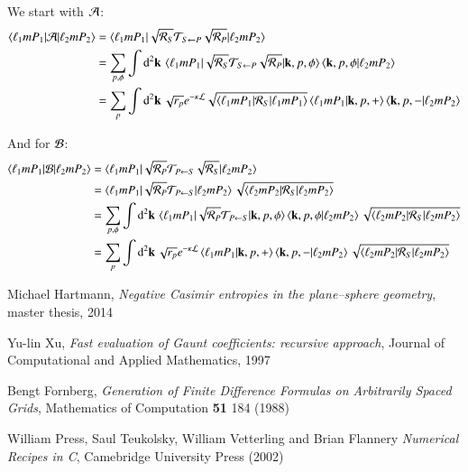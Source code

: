 \documentclass[superscriptaddress,prb]{revtex4-1}
\newcommand{\e}{e}    %
\renewcommand{\vec}[1]{{\mathbf{#1}}}
\begin{document}
We start with $\cal A$:
\begin{align}
\braket{\ell_1 m P_1 | {\cal A} | \ell_2 m P_2} &= \braket{\ell_1 m P_1 | \sqrt{{\cal R}_S} {\cal T}_{S\leftarrow P} \sqrt{{\cal R}_P} | \ell_2 m P_2} \\
&= \sum_{p,\phi} \int\mathrm{d}^2\vec k \, \braket{\ell_1 m P_1 | \sqrt{{\cal R}_S} {\cal T}_{S\leftarrow P} \sqrt{{\cal R}_P} | \vec k,p,\phi} \braket{\vec k, p, \phi | \ell_2 m P_2} \\
&= \sum_p \int\mathrm{d}^2\vec k \, \sqrt{r_p} \e^{-\kappa\cal L} \sqrt{\braket{\ell_1 m P_1 | {\cal R}_S | \ell_1 m P_1}} \braket{\ell_1 m P_1 | \vec k,p,+} \braket{\vec k, p,- | \ell_2 m P_2} \\
\end{align}

And for $\cal B$:
\begin{align}
\braket{\ell_1 m P_1 | {\cal B} | \ell_2 m P_2} &= \braket{\ell_1 m P_1 | \sqrt{{\cal R}_P} {\cal T}_{P\leftarrow S} \sqrt{{\cal R}_S} | \ell_2 m P_2} \\
&= \braket{\ell_1 m P_1 | \sqrt{{\cal R}_P} {\cal T}_{P\leftarrow S} | \ell_2 m P_2} \sqrt{\braket{\ell_2 m P_2 | {\cal R}_S | \ell_2 m P_2}} \\
&= \sum_{p,\phi} \int\mathrm{d}^2\vec k \, \braket{\ell_1 m P_1 | \sqrt{{\cal R}_P} {\cal T}_{P\leftarrow S} | \vec k,p,\phi} \braket{\vec k,p,\phi | \ell_2 m P_2} \sqrt{\braket{\ell_2 m P_2 | {\cal R}_S | \ell_2 m P_2}} \\
&= \sum_p \int\mathrm{d}^2\vec k \, \sqrt{r_p} \e^{-\kappa\cal L} \braket{\ell_1 m P_1 | \vec k, p,+} \braket{\vec k,p,- | \ell_2 m P_2} \sqrt{\braket{\ell_2 m P_2 | {\cal R}_S | \ell_2 m P_2}}
\end{align}



\begin{thebibliography}{99}

  Michael Hartmann,
  \emph{Negative Casimir entropies in the plane–sphere geometry}, master thesis, 2014

  Yu-lin Xu,
  \emph{Fast evaluation of Gaunt coefficients: recursive approach}, Journal of Computational and Applied Mathematics, 1997

  Bengt Fornberg,
  \emph{Generation of Finite Difference Formulas on Arbitrarily Spaced Grids}, Mathematics of Computation \textbf{51} 184 (1988)

  William Press, Saul Teukolsky, William Vetterling and Brian Flannery
  \emph{Numerical Recipes in C}, Camebridge University Press (2002)

\end{thebibliography}
\end{document}
